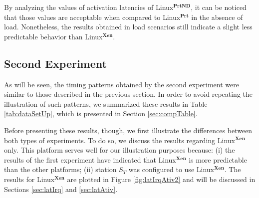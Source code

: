 \documentclass{acm_proc_article-sp}
\begin{document}
\begin{figure*}[t]%
 \centering
  \hspace{10pt}%

  \hspace{10pt}%

 \caption[Activation latencies]{Linux$^{\mathbf{Xen}}$ latencies. Interrupt requests
   at $S_M$ are triggered at a $20 Hz$ frequency by $S_T$.}
 \label{fig:latIrqAtiv2}%
\end{figure*}


By analyzing the values of activation latencies of Linux$^{\mathbf{PrtND}}$, 
it can be noticed that those values are acceptable when compared to
Linux$^{\mathbf{Prt}}$ in the absence of load. 
Nonetheless, the results obtained in load scenarios still indicate a slight
less predictable behavior than Linux$^{\mathbf{Xen}}$.

\subsection{Second Experiment}
\label{sec:results-2}

As will be seen, the timing patterns obtained by the second experiment were similar
to those described in the previous section. In order to avoid repeating the
illustration of such patterns, we summarized these results in Table
\ref{tab:dataSetUp}, which is presented in Section \ref{sec:compTable}.

Before presenting these results, though, we first illustrate the differences between
both types of experiments. To do so, we discuss the results regarding
Linux$^{\mathbf{Xen}}$ only. This platform serves well for our illustration purposes
because: (i) the results of the first experiment have indicated that
Linux$^{\mathbf{Xen}}$ is more predictable than the other platforms; (ii) station
$S_T$ was configured to use Linux$^{\mathbf{Xen}}$.  The results for
Linux$^{\mathbf{Xen}}$ are plotted in Figure \ref{fig:latIrqAtiv2} and will be
discussed in Sections \ref{sec:latIrq} and \ref{sec:latAtiv}.
\end{document}
